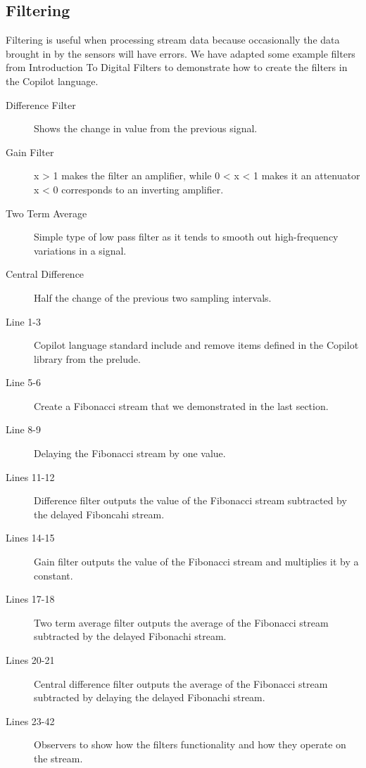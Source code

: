 \subsection{Filtering} \label{sec:filter}

Filtering is useful when processing stream data because occasionally the data
brought in by the sensors will have errors. We have adapted some example filters
from Introduction To Digital Filters \cite{Tyson2013} to demonstrate how to create the filters in the Copilot
language.
\begin{description}
 \item[Difference Filter] Shows the change in value from the previous signal.
 \item[Gain Filter]  x \textgreater{} 1 makes the filter an amplifier, while 0 \textless{} x \textless{} 1 makes it an attenuator x \textless{} 0 corresponds to an inverting amplifier. 
 \item[Two Term Average] Simple type of low pass filter as it tends to smooth out high-frequency variations in a signal.
 \item[Central Difference] Half the change of the previous two sampling intervals. 
\end{description} 
%

%

\begin{description}
  \item[Line 1-3] Copilot language standard include and remove 
  items defined in the Copilot library from the prelude.
  \item[Line 5-6] Create a Fibonacci stream that we demonstrated in the last section.
  \item[Line 8-9] Delaying the Fibonacci stream by one value.
  \item[Lines 11-12] Difference filter outputs the value of the Fibonacci stream subtracted by the delayed Fiboncahi stream. 
  \item[Lines 14-15] Gain filter outputs the value of the Fibonacci stream and multiplies it by a constant.
  \item[Lines 17-18] Two term average filter outputs the average of the Fibonacci stream subtracted by the delayed Fibonachi stream. 
  \item[Lines 20-21] Central difference filter outputs the average of the Fibonacci stream subtracted by delaying the delayed Fibonachi stream. 
  \item[Lines 23-42] Observers to show how the filters functionality and how they operate on the stream. 

\end{description}

